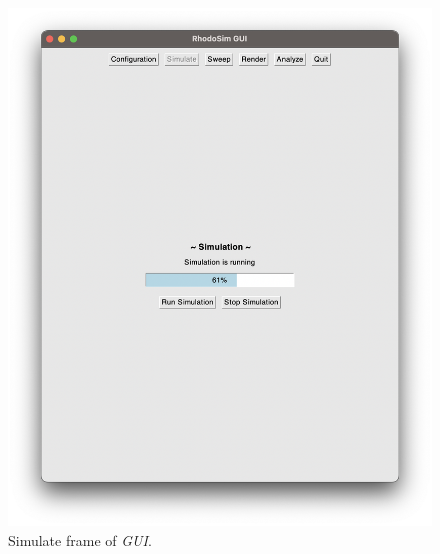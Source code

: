 \documentclass[a4paper,oneside,12pt]{report}
\numberwithin{equation}{chapter}
\begin{document}
{\begin{figure}[H]
    \centering
    \includegraphics[width=0.85\linewidth]{./figures/rhodoSim/GUI_simulation_frame.png}
    \vspace{-20pt}
    \caption{Simulate frame of \textit{GUI}.}
    \label{fig:gui_simulate_1}
\end{figure}

\clearpage
}
\end{document}
